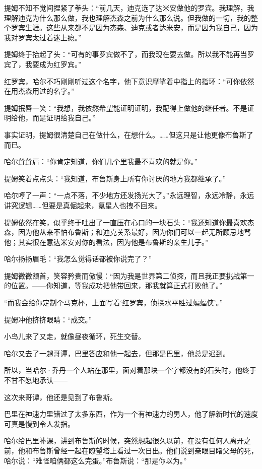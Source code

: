 \documentclass[../main]{subfiles}
\begin{document}
提姆不知不觉间捏紧了拳头：“前几天，迪克选了达米安做他的罗宾。我理解，我理解迪克为什么那么做，我也理解杰森之前为什么那么说。但我做的一切，我的整个罗宾生涯。这些从来都不是因为杰森、迪克或者达米安，而是因为我自己，因为我对罗宾太过着迷上瘾。”

提姆终于抬起了头：“可有的事罗宾做不了，而我现在要去做。所以我不能再当罗宾了，我要成为红罗宾。”

红罗宾，哈尔不巧刚刚听过这个名字，他下意识摩挲着中指上的指环：“可你依然在用杰森用过的名字。”

提姆抿唇一笑：“我想，我依然希望能证明证明，我配得上做他的继任者。不是证明给他，而是证明给我自己。”

事实证明，提姆很清楚自己在做什么，在想什么。……但这只是让他更像布鲁斯了而已。

哈尔耸耸肩：“你肯定知道，你们几个里我最不喜欢的就是你。”

提姆笑着点点头：“我知道，布鲁斯身上所有你讨厌的地方我都继承了。”

哈尔哼了一声：“一点不落，不少地方还发扬光大了。”永远理智，永远冷静，永远讲究逻辑……但要是真倔起来，氪星人也拽不回来。

提姆依然在笑，似乎终于吐出了一直压在心口的一块石头：“我还知道你最喜欢杰森，因为他从来不怕布鲁斯；和迪克关系最好，因为你们可以一起无所顾忌地骂他；其实很在意达米安对你的看法，因为他是布鲁斯的亲生儿子。”

哈尔扬扬眉毛：“我怎么觉得话都被你说完了？”

提姆微微颔首，笑容矜贵而傲慢：“因为我是世界第二侦探，而且我正要挑战第一的位置。——你知道，等我成功把他带回来，那我就算正式打败他了。”

“而我会给你定制个马克杯，上面写着`红罗宾，侦探水平胜过蝙蝠侠'。”

提姆冲他挤挤眼睛：“成交。”

小鸟儿来了又走，就像昼夜循环，死生交替。

哈尔又去了一趟哥谭，巴里答应和他一起去，但那是巴里，他总是迟到。

所以，当哈尔·乔丹一个人站在那里，面对着那块一个字都没有的石头时，他终于不甘不愿地承认——

这次来哥谭，他还是见到了布鲁斯。

巴里在神速力里错过了太多东西，作为一个有神速力的男人，他了解新时代的速度可真是慢到令人发指。

哈尔给巴里补课，讲到布鲁斯的时候，突然想起很久以前，在没有任何人离开之前，他和布鲁斯曾经一起在瞭望塔上看过一次日出。他们说到亲眼目睹父母的死，哈尔说：“难怪咱俩都这么完蛋。”布鲁斯说：“那是你以为。”
\end{document}

